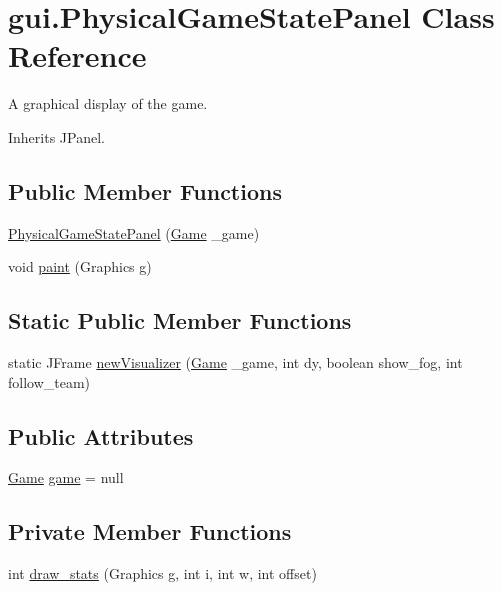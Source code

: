 \hypertarget{classgui_1_1_physical_game_state_panel}{
\section{gui.PhysicalGameStatePanel Class Reference}
\label{classgui_1_1_physical_game_state_panel}
}


A graphical display of the game.  




Inherits JPanel.

\subsection*{Public Member Functions}
\begin{DoxyCompactItemize}
\item 
\hyperlink{classgui_1_1_physical_game_state_panel_ab399c586669f78b942828763728a1b40}{PhysicalGameStatePanel} (\hyperlink{classrts_1_1_game}{Game} \_\-game)
\item 
void \hyperlink{classgui_1_1_physical_game_state_panel_afb3ad2acc58bbf0f8ffa5a4defe87852}{paint} (Graphics g)
\end{DoxyCompactItemize}
\subsection*{Static Public Member Functions}
\begin{DoxyCompactItemize}
\item 
static JFrame \hyperlink{classgui_1_1_physical_game_state_panel_abdbe84a6fd734dd02f1ad9074749df52}{newVisualizer} (\hyperlink{classrts_1_1_game}{Game} \_\-game, int dy, boolean show\_\-fog, int follow\_\-team)
\end{DoxyCompactItemize}
\subsection*{Public Attributes}
\begin{DoxyCompactItemize}
\item 
\hyperlink{classrts_1_1_game}{Game} \hyperlink{classgui_1_1_physical_game_state_panel_af4eaee7c6480b100814b944ee2d8c6bd}{game} = null
\end{DoxyCompactItemize}
\subsection*{Private Member Functions}
\begin{DoxyCompactItemize}
\item 
int \hyperlink{classgui_1_1_physical_game_state_panel_ae15b48464f8a67554012be6f7a04dfd6}{draw\_\-stats} (Graphics g, int i, int w, int offset)
\end{DoxyCompactItemize}
